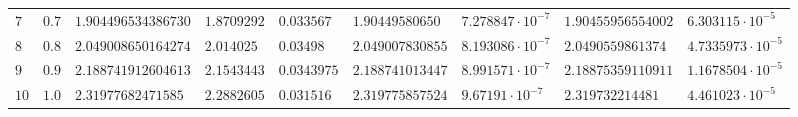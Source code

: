 \begin{table}[h!]
\begin{tabular}{|p{2ex}|p{3ex}|l|l|l|l|l|l|l|}
		$  7 $ & $  0.7 $                & $ 1.904496534386730 $  & $ 1.8709292 $            & $  0.033567 $            & $  1.90449580650 $       & $ 7.278847\cdot 10^{-7} $ & $ 1.90455956554002 $     & $  6.303115\cdot 10^{-5} $ \\
		$  8 $ & $                 0.8 $ & $ 2.049008650164274 $  & $  2.014025 $            & $   0.03498 $            & $ 2.049007830855 $       & $ 8.193086\cdot 10^{-7} $ & $  2.0490559861374 $     & $ 4.7335973\cdot 10^{-5} $ \\
		$  9 $ & $                 0.9 $ & $ 2.188741912604613 $  & $ 2.1543443 $            & $ 0.0343975 $            & $ 2.188741013447 $       & $ 8.991571\cdot 10^{-7} $ & $ 2.18875359110911 $     & $ 1.1678504\cdot 10^{-5} $ \\
		$ 10 $ & $                 1.0 $ & $  2.31977682471585 $  & $ 2.2882605 $            & $  0.031516 $            & $ 2.319775857524 $       & $  9.67191\cdot 10^{-7} $ & $   2.319732214481 $     & $  4.461023\cdot 10^{-5} $ \\
		\hline
	\end{tabular}
\end{table}

